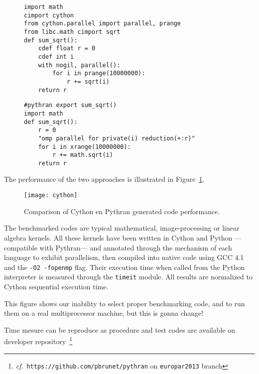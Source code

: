\documentclass{llncs}
\begin{document}
\begin{figure}[ht]

    \begin{lstlisting}[label={lst:cython-sample}, caption={Cython Impelmentation
    of a Parallel Reduction.}]
import math
cimport cython
from cython.parallel import parallel, prange
from libc.math cimport sqrt
def sum_sqrt():
    cdef float r = 0
    cdef int i
    with nogil, parallel():
        for i in prange(10000000):
            r += sqrt(i)
    return r
\end{lstlisting}
\end{figure}
%
\begin{figure}[ht]
    \begin{lstlisting}[label={lst:pythran-sample}, caption={Cython Impelmentation
    of a Parallel Reduction.}]
#pythran export sum_sqrt()
import math
def sum_sqrt():
    r = 0
    "omp parallel for private(i) reduction(+:r)"
    for i in xrange(10000000):
        r += math.sqrt(i)
    return r
    \end{lstlisting}
\end{figure}



The performance of the two approaches is illustrated in
Figure~\ref{fig:cython-pythran}.

\begin{figure}[ht]
    \texttt{[image: cython]}
    \caption{Comparison of Cython en Pythran generated code performance.}
    \label{fig:cython-pythran}
\end{figure}

The benchmarked codes are typical mathematical, image-processing or linear
algebra kernels. All these kernels have been written in Cython and Python
---compatible with Pythran--- and annotated through the mechanism of each
language to exhibit parallelism, then compiled into native code using GCC 4.1
and the \texttt{-O2 -fopenmp} flag. Their execution time when called from the
Python interpreter is measured through the \texttt{timeit} module. All results
are normalized to Cython sequential execution time.

This figure shows our inability to select proper benchmarking code, and to run
them on a real multiprocessor machine, but this is gonna change!~

Time mesure can be reproduce as procedure and test codes are available on 
developer repository~\footnote{\emph{cf}.\
\texttt{https://github.com/pbrunet/pythran} on \texttt{europar2013} branch} 
\end{document}
